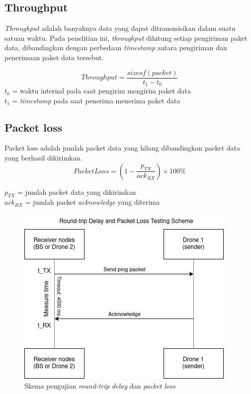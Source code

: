 \subsection{Throughput}
\textit{Throughput} adalah banyaknya data yang dapat ditransmisikan dalam suatu satuan waktu. Pada penelitian ini, \textit{throughput} dihitung setiap pengiriman paket data, dibandingkan dengan perbedaan \textit{timestamp} antara pengiriman dan penerimaan paket data tersebut.

\begin{equation}
	Throughput = \frac{sizeof(packet)}{t_1 - t_0}
\end{equation}
$t_0$ = waktu internal pada saat pengirim mengirim paket data\\
$t_1$ = \textit{timestamp} pada saat penerima menerima paket data

\subsection{Packet loss}
Packet loss adalah jumlah packet data yang hilang dibandingkan packet data yang berhasil dikirimkan.
\begin{equation}
	Packet Loss = (1 - \frac{p_{TX}}{ack_{RX}})\times 100\%
\end{equation}

$p_{TX}$ = jumlah packet data yang dikirimkan\\
$ack_{RX}$ = jumlah packet \textit{acknowledge} yang diterima

\begin{figure}[H]
	\centering
	\includegraphics[scale=0.7]{./assets/PingTest}
	\caption{Skema pengujian \textit{round-trip delay} dan \textit{packet loss}}
\end{figure}